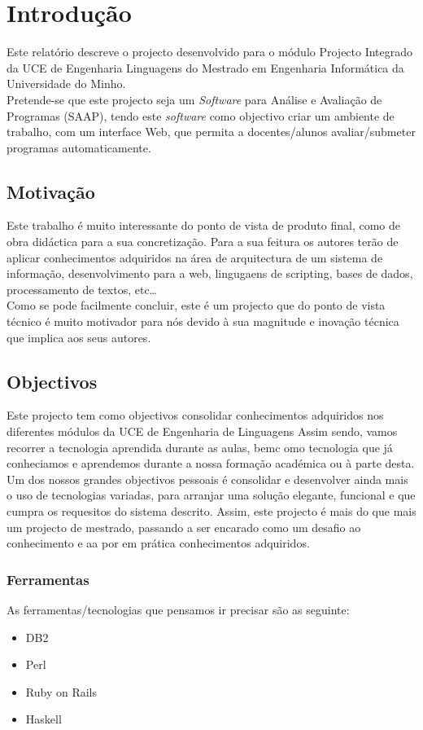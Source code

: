 \chapter{Introdução} \label{chap int}
Este relatório descreve o projecto desenvolvido para o módulo Projecto Integrado da UCE de Engenharia Linguagens do Mestrado em Engenharia Informática da Universidade do Minho.\\

Pretende-se que este projecto seja um \emph{Software} para Análise e Avaliação de Programas (SAAP), tendo este \emph{software} como objectivo criar um 
ambiente de trabalho, com um interface Web, que permita a docentes/alunos avaliar/submeter programas automaticamente.

\section{Motivação}
Este trabalho é muito interessante do ponto de vista de produto final, como de obra didáctica para a sua concretização. Para a sua feitura os autores terão de aplicar
conhecimentos adquiridos na área de arquitectura de um sistema de informação, desenvolvimento para a web, lingugaens de scripting, bases de dados, processamento de textos, etc\ldots\\
Como se pode facilmente concluir, este é um projecto que do ponto de vista técnico é muito motivador para nós devido à sua magnitude e inovação técnica que implica aos seus autores.

\section{Objectivos}
Este projecto tem como objectivos consolidar conhecimentos adquiridos nos diferentes módulos da UCE de Engenharia de Linguagens
Assim sendo, vamos recorrer a tecnologia aprendida durante as aulas, bemc omo tecnologia que já conheciamos e aprendemos durante a nossa formação académica ou à parte desta.
Um dos nossos grandes objectivos pessoais é consolidar e desenvolver ainda mais o uso de tecnologias variadas, para arranjar uma solução elegante, funcional e que cumpra os requesitos do sistema descrito.
Assim, este projecto é mais do que mais um projecto de mestrado, passando a ser encarado como um desafio ao conhecimento e aa por em prática conhecimentos adquiridos.

\subsection{Ferramentas}
As ferramentas/tecnologias que pensamos ir precisar são as seguinte:
\begin{itemize}
\item DB2
\item Perl
\item Ruby on Rails
\item Haskell
\end{itemize}

